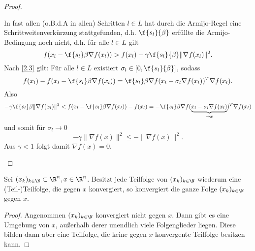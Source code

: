 \begin{st}
\begin{proof}
\begin{enumerate}[a)]
				In fast allen (o.B.d.A in allen) Schritten $l \in L$ hat durch die Armijo-Regel eine Schrittweitenverkürzung stattgefunden, d.h. $\f {s_l}{\beta}$ erfüllte die Armijo-Bedingung noch nicht, d.h. für alle $l \in L$ gilt
				\[
					f(x_l - \f {s_l}\beta \nabla f(x_l))
					> f(x_l) - \gamma \f {s_l}{\beta} \| \nabla f(x_l) \|^2.
				\]
				Nach \ref{2.3} gilt:
				Für alle $l \in L$ existiert $\sigma_l \in [0, \f {s_l}{\beta}]$, sodass
				\[
					f(x_l) - f(x_l - \f {s_l}\beta \nabla f(x_l))
					= \f {s_l}\beta \nabla f(x_l - \sigma_l \nabla f(x_l))^T \nabla f(x_l).
				\]
				Also
				\[
					-\gamma \f {s_l}\beta \|\nabla f(x_l)\|^2
					< f(x_l - \f{s_l}\beta \nabla f(x_l)) - f(x_l)
					= -\f {s_l}\beta \nabla f(\underbrace{x_l - \sigma_l \nabla f(x_l)}_{\to x})^T \nabla f(x_l)
				\]
				und somit für $\sigma_l \to 0$
				\[
					- \gamma \|\nabla f(x)\|^2 \le - \| \nabla f(x)\|^2.
				\]
				Aus $\gamma < 1$ folgt damit $\nabla f(x) = 0$.
		\end{enumerate}
	\end{proof}
\end{st}

\begin{lem} \label{2.25}
	Sei $(x_k)_{k\in\N} \subset \R^n, x \in \R^n$.
	Besitzt jede Teilfolge von $(x_k)_{k\in\N}$ wiederum eine (Teil-)Teilfolge, die gegen $x$ konvergiert, so konvergiert die ganze Folge $(x_k)_{k\in\N}$ gegen $x$.
	\begin{proof}
		Angenommen $(x_k)_{k\in\N}$ konvergiert nicht gegen $x$.
		Dann gibt es eine Umgebung von $x$, außerhalb derer unendlich viele Folgenglieder liegen.
		Diese bilden dann aber eine Teilfolge, die keine gegen $x$ konvergente Teilfolge besitzen kann.
	\end{proof}
\end{lem}


